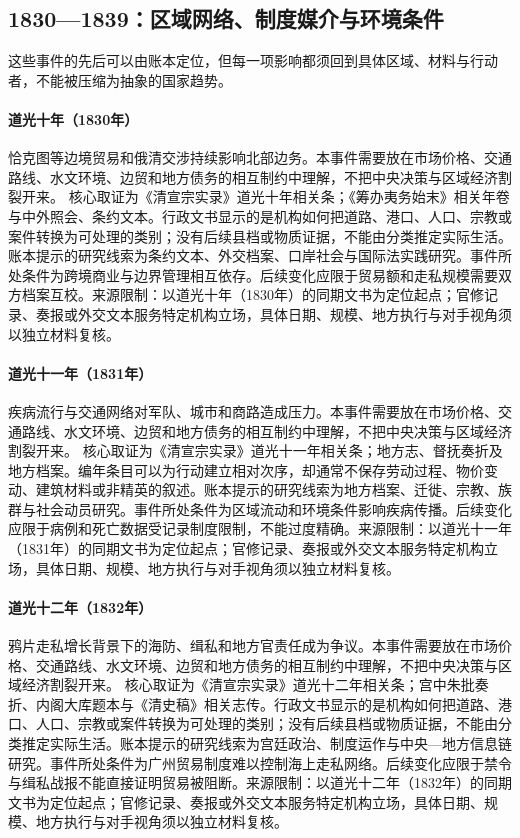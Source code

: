 \subsection{1830—1839：区域网络、制度媒介与环境条件}
这些事件的先后可以由账本定位，但每一项影响都须回到具体区域、材料与行动者，不能被压缩为抽象的国家趋势。
\hypertarget{civic:EQ-1830-RUSSO-QING-TRADE}{}\paragraph{道光十年（1830年）}恰克图等边境贸易和俄清交涉持续影响北部边务。本事件需要放在市场价格、交通路线、水文环境、边贸和地方债务的相互制约中理解，不把中央决策与区域经济割裂开来。 核心取证为《清宣宗实录》道光十年相关条；《筹办夷务始末》相关年卷与中外照会、条约文本。行政文书显示的是机构如何把道路、港口、人口、宗教或案件转换为可处理的类别；没有后续县档或物质证据，不能由分类推定实际生活。账本提示的研究线索为条约文本、外交档案、口岸社会与国际法实践研究。事件所处条件为跨境商业与边界管理相互依存。后续变化应限于贸易额和走私规模需要双方档案互校。来源限制：以道光十年（1830年）的同期文书为定位起点；官修记录、奏报或外交文本服务特定机构立场，具体日期、规模、地方执行与对手视角须以独立材料复核。
\hypertarget{civic:EQ-1831-CENTRAL-ASIA-CHOLERA}{}\paragraph{道光十一年（1831年）}疾病流行与交通网络对军队、城市和商路造成压力。本事件需要放在市场价格、交通路线、水文环境、边贸和地方债务的相互制约中理解，不把中央决策与区域经济割裂开来。 核心取证为《清宣宗实录》道光十一年相关条；地方志、督抚奏折及地方档案。编年条目可以为行动建立相对次序，却通常不保存劳动过程、物价变动、建筑材料或非精英的叙述。账本提示的研究线索为地方档案、迁徙、宗教、族群与社会动员研究。事件所处条件为区域流动和环境条件影响疾病传播。后续变化应限于病例和死亡数据受记录制度限制，不能过度精确。来源限制：以道光十一年（1831年）的同期文书为定位起点；官修记录、奏报或外交文本服务特定机构立场，具体日期、规模、地方执行与对手视角须以独立材料复核。
\hypertarget{civic:EQ-1832-COASTAL-DEFENCE}{}\paragraph{道光十二年（1832年）}鸦片走私增长背景下的海防、缉私和地方官责任成为争议。本事件需要放在市场价格、交通路线、水文环境、边贸和地方债务的相互制约中理解，不把中央决策与区域经济割裂开来。 核心取证为《清宣宗实录》道光十二年相关条；宫中朱批奏折、内阁大库题本与《清史稿》相关志传。行政文书显示的是机构如何把道路、港口、人口、宗教或案件转换为可处理的类别；没有后续县档或物质证据，不能由分类推定实际生活。账本提示的研究线索为宫廷政治、制度运作与中央—地方信息链研究。事件所处条件为广州贸易制度难以控制海上走私网络。后续变化应限于禁令与缉私战报不能直接证明贸易被阻断。来源限制：以道光十二年（1832年）的同期文书为定位起点；官修记录、奏报或外交文本服务特定机构立场，具体日期、规模、地方执行与对手视角须以独立材料复核。
